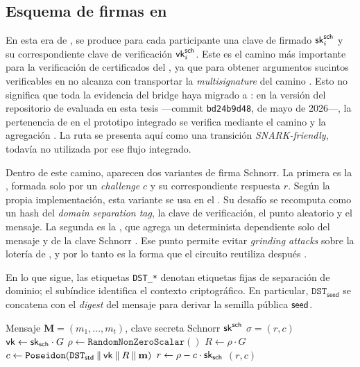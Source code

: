 \subsection{Esquema de firmas en \Lagrange}
\label{subsec:protocolo-stm-y-esquemas-de-firma-esquema-de-firmas-en-lagrange}

En esta era de \Mithril, se produce para cada participante una clave de firmado $\mathsf{sk}^{\mathsf{sch}}_i$ y su correspondiente clave de verificación $\mathsf{vk}^{\mathsf{sch}}_i$. Este es el camino más importante para la verificación \STM de certificados del \zkBridge, ya que para obtener argumentos sucintos verificables \Onchain en \ChainB no alcanza con transportar la \BLS \textit{multisignature} del camino \Pythagoras. Esto no significa que toda la evidencia del bridge haya migrado a \Lagrange: en la versión del repositorio de \Mithril evaluada en esta tesis ---commit \texttt{bd24b9d48}, de mayo de 2026---, la pertenencia de \CardanoTransactions en el prototipo integrado se verifica mediante el camino \Pythagoras y la agregación \Concatenation. La ruta \Lagrange se presenta aquí como una transición \textit{SNARK-friendly}, todavía no utilizada por ese flujo integrado.

Dentro de este camino, aparecen dos variantes de firma Schnorr. La primera es la \StandardSchnorrSignature, formada solo por un \textit{challenge} $c$ y su correspondiente respuesta $r$. Según la propia implementación, esta variante se usa en el \SNARK \GenesisCertificate. Su desafío se recomputa como un hash \PoseidonHash del \textit{domain separation tag}, la clave de verificación, el punto aleatorio y el mensaje. La segunda es la \UniqueSchnorrSignature, que agrega un \CommitmentPoint determinista dependiente solo del mensaje y de la clave Schnorr \SchnorrSK. Ese punto permite evitar \textit{grinding attacks} sobre la lotería de \MithrilAggregator, y por lo tanto es la forma que el circuito \HaloTwo reutiliza después \cite{MithrilSTMRepo}.

En lo que sigue, las etiquetas \texttt{DST\_*} denotan etiquetas fijas de separación de dominio; el subíndice identifica el contexto criptográfico. En particular, $\texttt{DST}_{\mathsf{seed}}$ se concatena con el \textit{digest} del mensaje para derivar la semilla pública $\mathsf{seed}$.

\begin{algorithm}[ht]
	\caption{\StandardSchnorrSignature en la era \Lagrange}
	\label{alg:mithril-lagrange-standard-schnorr-sign}
	\begin{algorithmic}[1]
		\Require Mensaje $\mathbf{M} = (m_1, \ldots, m_t)$, clave secreta Schnorr $\mathsf{sk}^{\mathsf{sch}}$
		\Ensure $\sigma = (r, c)$
		\State $\mathsf{vk} \gets \mathsf{sk}_{\mathsf{sch}} \cdot G$
		\State $\rho \gets \texttt{RandomNonZeroScalar}()$
		\State $R \gets \rho \cdot G$
		\State $c \gets \texttt{Poseidon}(\texttt{DST}_{\mathsf{std}} \mathbin{\|} \mathsf{vk} \mathbin{\|} R \mathbin{\|} \mathbf{m})$
		\State $r \gets \rho - c \cdot \mathsf{sk}_{\mathsf{sch}}$
		\State \Return $(r, c)$
	\end{algorithmic}
\end{algorithm}


